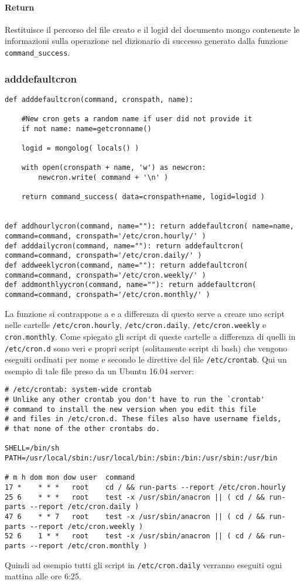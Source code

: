 \documentclass[11pt]{article}
\begin{document}
\paragraph{Return}
Restituisce il percorso del file creato e il logid del documento mongo contenente le informazioni sulla operazione nel dizionario
di successo generato dalla funzione \texttt{command\_success}.

\subsubsection{adddefaultcron}\label{adddefaultcron}
\begin{lstlisting}
def adddefaultcron(command, cronspath, name):

    #New cron gets a random name if user did not provide it
    if not name: name=getcronname()

    logid = mongolog( locals() )

    with open(cronspath + name, 'w') as newcron:
        newcron.write( command + '\n' )

    return command_success( data=cronspath+name, logid=logid )


def addhourlycron(command, name=""): return addefaultcron( name=name, command=command, cronspath='/etc/cron.hourly/' )
def adddailycron(command, name=""): return addefaultcron( command=command, cronspath='/etc/cron.daily/' )
def addweeklycron(command, name=""): return addefaultcron( command=command, cronspath='/etc/cron.weekly/' )
def addmonthlyycron(command, name=""): return addefaultcron( command=command, cronspath='/etc/cron.monthly/' )
\end{lstlisting}
La funzione si contrappone a  e a differenza di questo serve a creare uno script nelle cartelle
\texttt{/etc/cron.hourly}, \texttt{/etc/cron.daily}, \texttt{/etc/cron.weekly} e \texttt{cron.monthly}. Come spiegato
gli script di queste cartelle a differenza di quelli in \texttt{/etc/cron.d} sono veri e propri script
(solitamente script di bash) che vengono eseguiti ordinati per nome e secondo le direttive del file \texttt{/etc/crontab}.
Qui un esempio di tale file preso da un Ubuntu 16.04 server:
\begin{lstlisting}
# /etc/crontab: system-wide crontab
# Unlike any other crontab you don't have to run the `crontab'
# command to install the new version when you edit this file
# and files in /etc/cron.d. These files also have username fields,
# that none of the other crontabs do.

SHELL=/bin/sh
PATH=/usr/local/sbin:/usr/local/bin:/sbin:/bin:/usr/sbin:/usr/bin

# m h dom mon dow user	command
17 *	* * *	root    cd / && run-parts --report /etc/cron.hourly
25 6	* * *	root	test -x /usr/sbin/anacron || ( cd / && run-parts --report /etc/cron.daily )
47 6	* * 7	root	test -x /usr/sbin/anacron || ( cd / && run-parts --report /etc/cron.weekly )
52 6	1 * *	root	test -x /usr/sbin/anacron || ( cd / && run-parts --report /etc/cron.monthly )
\end{lstlisting}
Quindi ad esempio tutti gli script in \texttt{/etc/cron.daily} verranno eseguiti ogni mattina alle ore 6:25.
\end{document}
